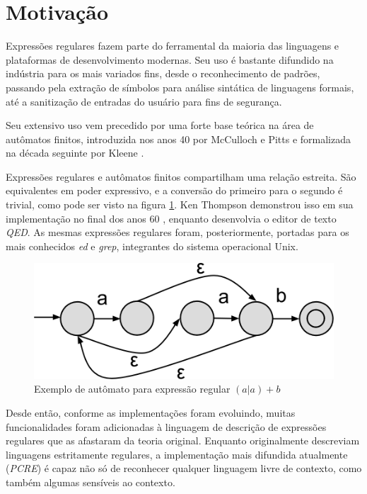 \documentclass[a4paper,12pt,oneside,onecolumn]{uerj}
\begin{document}
\section{Motivação}

Expressões regulares fazem parte do ferramental da maioria das linguagens e plataformas de desenvolvimento modernas. Seu uso é bastante difundido na indústria para os mais variados fins, desde o reconhecimento de padrões, passando pela extração de símbolos para análise sintática de linguagens formais, até a sanitização de entradas do usuário para fins de segurança.

Seu extensivo uso vem precedido por uma forte base teórica na área de autômatos finitos, introduzida nos anos 40 por McCulloch e Pitts \cite{bib:McCulloch43} e formalizada na década seguinte por Kleene \cite{bib:Kleene56}.

Expressões regulares e autômatos finitos compartilham uma relação estreita. São equivalentes em poder expressivo, e a conversão do primeiro para o segundo é trivial, como pode ser visto na figura \ref{fig:exemplo_automato}. Ken Thompson demonstrou isso em sua implementação no final dos anos 60 \cite{bib:Thompson68}, enquanto desenvolvia o editor de texto \emph{QED}. As mesmas expressões regulares foram, posteriormente, portadas para os mais conhecidos \emph{ed} e \emph{grep}, integrantes do sistema operacional Unix.

\begin{figure}[ht]
  \centering
  \includegraphics[scale=0.3]{figures/exemplo_automato.png}
  \caption{Exemplo de autômato para expressão regular $(a|a)+b$}
  \label{fig:exemplo_automato}
\end{figure}

Desde então, conforme as implementações foram evoluindo, muitas funcionalidades foram adicionadas à linguagem de descrição de expressões regulares que as afastaram da teoria original. Enquanto originalmente descreviam linguagens estritamente regulares, a implementação mais difundida atualmente (\emph{PCRE}) é capaz não só de reconhecer qualquer linguagem livre de contexto, como também algumas sensíveis ao contexto. \cite{bib:Nikita12}
\end{document}
